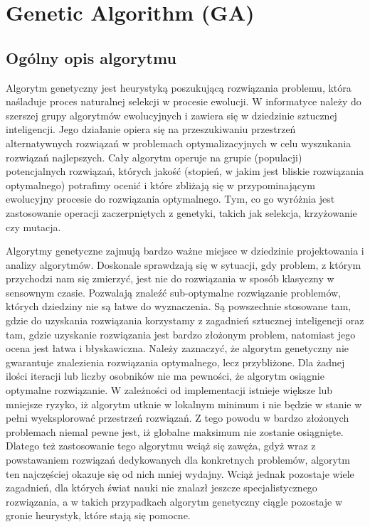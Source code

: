 \section{Genetic Algorithm (GA)}
\author{Filip Czajkowski}
\subsection{Ogólny opis algorytmu}
\par Algorytm genetyczny jest heurystyką poszukującą rozwiązania problemu, która naśladuje proces naturalnej selekcji w procesie ewolucji. W informatyce należy do szerszej grupy algorytmów ewolucyjnych i zawiera się w dziedzinie sztucznej inteligencji. Jego działanie opiera się na przeszukiwaniu przestrzeń alternatywnych rozwiązań w problemach optymalizacyjnych w celu wyszukania rozwiązań najlepszych. Cały algorytm operuje na grupie (populacji) potencjalnych rozwiązań, których jakość (stopień, w jakim jest bliskie rozwiązania optymalnego) potrafimy ocenić i które zbliżają się w przypominającym ewolucyjny procesie do rozwiązania optymalnego. Tym, co go wyróżnia jest zastosowanie operacji zaczerpniętych z genetyki, takich jak selekcja, krzyżowanie czy mutacja.
\par Algorytmy genetyczne zajmują bardzo ważne miejsce w dziedzinie projektowania i analizy algorytmów. Doskonale sprawdzają się w sytuacji, gdy problem, z którym przychodzi nam się zmierzyć, jest nie do rozwiązania w sposób klasyczny w sensownym czasie. Pozwalają znaleźć sub-optymalne rozwiązanie problemów, których dziedziny nie są łatwe do wyznaczenia. Są powszechnie stosowane tam, gdzie do uzyskania rozwiązania korzystamy z zagadnień sztucznej inteligencji oraz tam, gdzie uzyskanie rozwiązania jest bardzo złożonym problem, natomiast jego ocena jest łatwa i błyskawiczna. Należy zaznaczyć, że algorytm genetyczny nie gwarantuje znalezienia rozwiązania optymalnego, lecz przybliżone. Dla żadnej ilości iteracji lub liczby osobników nie ma pewności, że algorytm osiągnie optymalne rozwiązanie. W zależności od implementacji istnieje większe lub mniejsze ryzyko, iż algorytm utknie w lokalnym minimum i nie będzie w stanie w pełni wyeksplorować przestrzeń rozwiązań. Z tego powodu w bardzo złożonych problemach niemal pewne jest, iż globalne maksimum nie zostanie osiągnięte. Dlatego też zastosowanie tego algorytmu wciąż się zawęża, gdyż wraz z powstawaniem rozwiązań dedykowanych dla konkretnych problemów, algorytm ten najczęściej okazuje się od nich mniej wydajny. Wciąż jednak pozostaje wiele zagadnień, dla których świat nauki nie znalazł jeszcze specjalistycznego rozwiązania, a w takich przypadkach algorytm genetyczny ciągle pozostaje w gronie heurystyk, które stają się pomocne.
